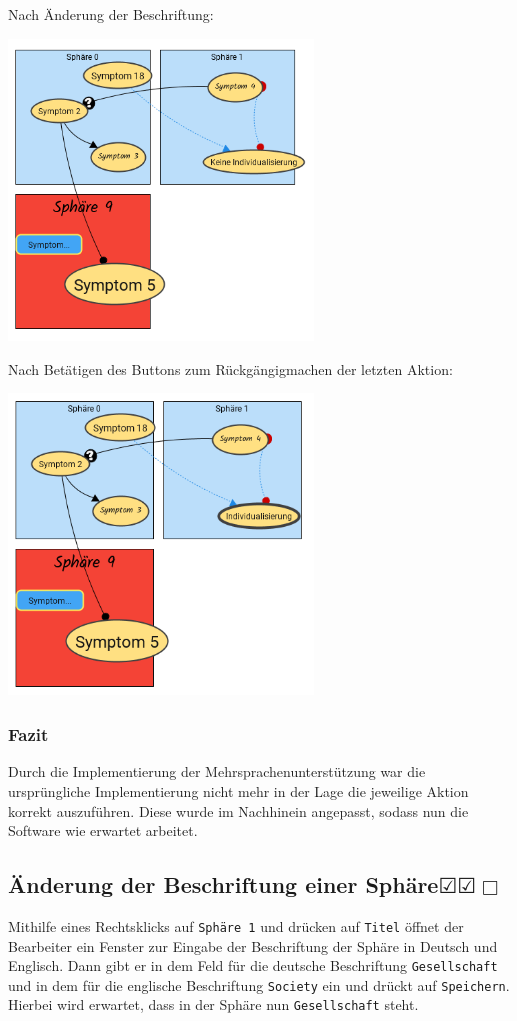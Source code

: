 \documentclass[enabledeprecatedfontcommands]{scrartcl}
\newcommand{\subsectiont}[2]{\subsection[#1]{#1{\normalsize\normalfont #2}}}
\newcommand{\leer}{$\Box$}
\newcommand{\ok}{$\CheckedBox$}
\begin{document}
\newpage
Nach Änderung der Beschriftung: 
\begin{center}
\includegraphics[height=8cm]{3_50vorher.PNG}
\end{center}
Nach Betätigen des Buttons zum Rückgängigmachen der letzten Aktion: 
\begin{center}
\includegraphics[height=8cm]{3_50nachher.PNG}
\end{center}
\subsubsection{Fazit}
Durch die Implementierung der Mehrsprachenunterstützung war die ursprüngliche Implementierung nicht mehr in der Lage die jeweilige Aktion korrekt auszuführen. Diese wurde im Nachhinein angepasst, sodass nun die Software wie erwartet arbeitet.

\subsectiont{Änderung der Beschriftung einer Sphäre}{\dotfill\ok\ok\leer}
Mithilfe eines Rechtsklicks auf \texttt{Sphäre 1} und drücken auf \texttt{Titel} öffnet der Bearbeiter ein Fenster zur Eingabe der Beschriftung der Sphäre in Deutsch und Englisch. Dann gibt er in dem Feld für die deutsche Beschriftung \texttt{Gesellschaft}  und in dem für die englische Beschriftung \texttt{Society} ein und drückt auf \texttt{Speichern}. Hierbei wird erwartet, dass in der Sphäre nun \texttt{Gesellschaft} steht. 
\end{document}
